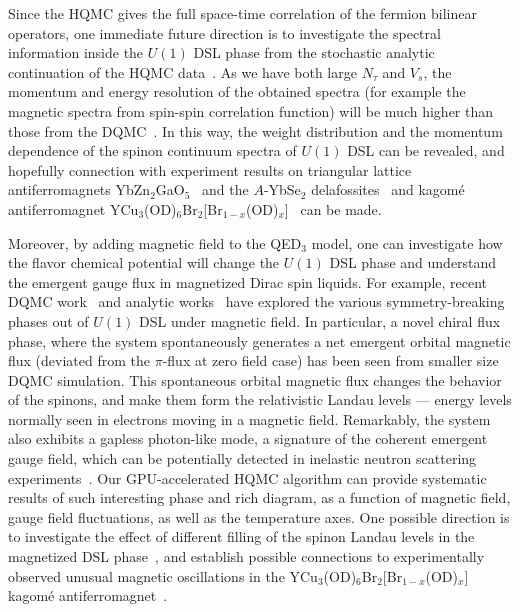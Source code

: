 \documentclass[aps,prl,twocolumn,superscriptaddress,showpacs,longbibliography]{revtex4-2}
\begin{document}
Since the HQMC gives the full space-time correlation of the fermion bilinear operators, one immediate future direction is to investigate the spectral information inside the $U(1)$ DSL phase from the stochastic analytic continuation of the HQMC data~\cite{chenEmergent2025}. As we have both large $N_\tau$ and $V_s$, the momentum and energy resolution of the obtained spectra (for example the magnetic spectra from spin-spin correlation function) will be much higher than those from the DQMC~\cite{chenEmergent2025}. In this way, the weight distribution and the momentum dependence of the spinon continuum spectra of $U(1)$ DSL can be revealed, and hopefully connection with experiment results on triangular lattice antiferromagnets YbZn$_2$GaO$_5$~\cite{BagEvidence24,WuSpinDynamics25} and the $A$-YbSe$_2$ delafossites~\cite{ScheieKYbSe2, ScheieNaYbSe2} and kagom\'e antiferromagnet YCu$_3$(OD)$_6$Br$_2$[Br$_{1-x}$(OD)$_{x}$]~\cite{zengPossible2022,zengSpectral2024,hanSpin2024,suetsuguEmergent2024,suetsuguGapless2024,jeonOne2024,zhengUnconventional2025} can be made.

Moreover, by adding magnetic field to the QED$_3$ model, one can investigate how the flavor chemical potential will change the $U(1)$ DSL phase and understand the emergent gauge flux in magnetized Dirac spin liquids. For example, recent DQMC work~\cite{chenEmergent2025} and analytic works~\cite{dumitrescuSymmetry2024,dumitrescuComments2025} have explored the various symmetry-breaking phases out of $U(1)$ DSL under magnetic field. In particular, a novel chiral flux phase, where the system spontaneously generates a net emergent orbital magnetic flux (deviated from the $\pi$-flux at zero field case) has been seen from smaller size DQMC simulation. This spontaneous orbital magnetic flux changes the behavior of the spinons, and make them form the relativistic Landau levels — energy levels normally seen in electrons moving in a magnetic field. Remarkably, the system also exhibits a gapless photon-like mode, a signature of the coherent emergent gauge field, which can be potentially detected in inelastic neutron scattering experiments~\cite{chenEmergent2025}. Our GPU-accelerated HQMC algorithm can provide systematic results of such interesting phase and rich diagram, as a function of magnetic field, gauge field fluctuations, as well as the temperature axes. One possible direction is to investigate the effect of different filling of the spinon Landau levels in the magnetized DSL phase~\cite{SodemannPseudoscalar21}, and establish possible connections to experimentally observed unusual magnetic oscillations in the YCu$_3$(OD)$_6$Br$_2$[Br$_{1-x}$(OD)$_{x}$] kagomé antiferromagnet~\cite{zhengUnconventional2025}.
\end{document}
